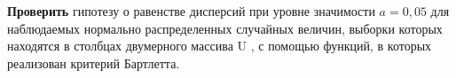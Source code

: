 \textbf{Проверить} гипотезу о равенстве дисперсий при уровне значимости $a=0,05$
для наблюдаемых нормально распределенных случайных величин,
выборки которых находятся в столбцах двумерного массива U , с помощью
функций, в которых реализован критерий Бартлетта.




